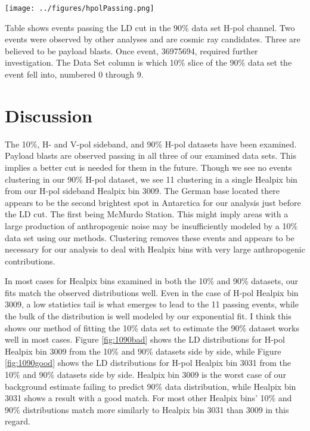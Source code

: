 \begin{table}[h]
\centering
\texttt{[image: ../figures/hpolPassing.png]}
\caption[Events passing LD Cut in 90\% H-pol sample]{Table shows events passing the LD cut in the 90\% data set H-pol channel.  Two events were observed by other analyses and are cosmic ray candidates.  Three are believed to be payload blasts.  Once event, 36975694, required further investigation.  The Data Set column is which 10\% slice of the 90\% data set the event fell into, numbered 0 through 9.}
\label{tab:hpolPassing}
\end{table}

\section{Discussion}

The 10\%, H- and V-pol sideband, and 90\% H-pol datasets have been examined.  Payload blasts are observed passing in all three of our examined data sets.  This implies a better cut is needed for them in the future.  Though we see no events clustering in our 90\% H-pol dataset, we see 11 clustering in a single Healpix bin from our H-pol sideband Healpix bin 3009.  The German base located there appears to be the second brightest spot in Antarctica for our analysis just before the LD cut.  The first being McMurdo Station.  This might imply areas with a large production of anthropogenic noise may be insufficiently modeled by a 10\% data set using our methods.  Clustering removes these events and appears to be necessary for our analysis to deal with Healpix bins with very large anthropogenic contributions.

In most cases for Healpix bins examined in both the 10\% and 90\% datasets, our fits match the observed distributions well.  Even in the case of H-pol Healpix bin 3009, a low statistics tail is what emerges to lead to the 11 passing events, while the bulk of the distribution is well modeled by our exponential fit.  I think this shows our method of fitting the 10\% data set to estimate the 90\% dataset works well in most cases.  Figure \ref{fig:1090bad} shows the LD distributions for H-pol Healpix bin 3009 from the 10\% and 90\% datasets side by side, while Figure \ref{fig:1090good} shows the LD distributions for H-pol Healpix bin 3031 from the 10\% and 90\% datasets side by side.  Healpix bin 3009 is the worst case of our background estimate failing to predict 90\% data distribution, while Healpix bin 3031 shows a result with a good match. For most other Healpix bins' 10\% and 90\% distributions match more similarly to Healpix bin 3031 than 3009 in this regard. 

